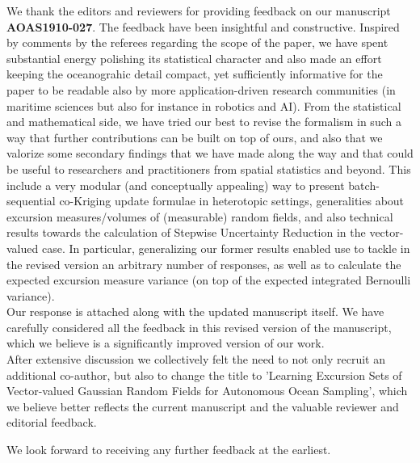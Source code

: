 \documentclass[10pt,stdletter]{newlfm}
\begin{document}
\begin{newlfm}

We thank the editors and reviewers for providing feedback on our manuscript \textbf{AOAS1910-027}. The feedback have been insightful and constructive. Inspired by comments by the referees regarding the scope of the paper, we have spent substantial energy polishing its statistical character and also made an effort keeping the oceanograhic detail compact, yet sufficiently informative for the paper to be readable also by more application-driven research communities (in maritime sciences but also for instance in robotics and AI). From the statistical and mathematical side, we have tried our best to revise the formalism in such a way that further contributions can be built on top of ours, and also that we valorize some secondary findings that we have made along the way and that could be useful to researchers and practitioners from spatial statistics and beyond. This include a very modular (and conceptually appealing) way to present batch-sequential co-Kriging update formulae in heterotopic settings, generalities about excursion measures/volumes of (measurable) random fields, and also technical results towards the calculation of Stepwise Uncertainty Reduction in the vector-valued case. In particular, generalizing our former results enabled use to tackle in the revised version an arbitrary number of responses, as well as to calculate the expected excursion measure variance (on top of the expected integrated Bernoulli variance).\\ 

Our response is attached along with the updated manuscript itself. We have carefully considered all the feedback in this revised version of the manuscript, which we believe is a significantly improved version of our work.\\ 

After extensive discussion we collectively felt the need to not only recruit an additional co-author, but also to change the title to 'Learning Excursion Sets of Vector-valued Gaussian Random Fields for Autonomous Ocean Sampling', which we believe better reflects the current manuscript and the valuable reviewer and editorial feedback. 



We look forward to receiving any further feedback at the earliest.
\vspace{1em}


\end{newlfm}
\end{document}
